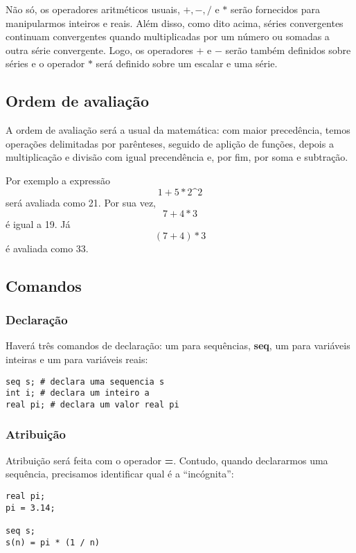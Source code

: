 \documentclass[a4 paper, 12pt]{article}
\begin{document}
N\~ao s\'o, os operadores aritm\'eticos usuais, $+, -, /$ e $*$
ser\~ao fornecidos para manipularmos inteiros e reais. Al\'em disso,
como dito acima, s\'eries convergentes continuam convergentes quando
multiplicadas por um n\'umero ou somadas a outra s\'erie
convergente. Logo, os operadores $+$ e $-$ ser\~ao tamb\'em definidos
sobre s\'eries e o operador $*$ ser\'a definido sobre um escalar e uma
s\'erie.

\subsection{Ordem de avalia\c c\~ao}
A ordem de avalia\c c\~ao ser\'a a usual da matem\'atica: com maior
preced\^encia, temos opera\c c\~oes delimitadas por par\^enteses,
seguido de apli\c c\~ao de fun\c c\~oes, depois a multiplica\c c\~ao e
divis\~ao com igual precend\^encia e, por fim, por soma e subtra\c
c\~ao.

Por exemplo a express\~ao
\begin{equation}
   1 + 5 * 2 \textrm{\textasciicircum} 2
\end{equation}
ser\'a avaliada como 21. Por sua vez,
\begin{equation}
  7 + 4 * 3
\end{equation}
\'e igual a 19. J\'a
\begin{equation}
  ( 7 + 4 ) * 3
\end{equation}
\'e avaliada como 33.

\subsection{Comandos}
\subsubsection{Declara\c c\~ao}
Haver\'a tr\^es comandos de declara\c c\~ao: um para sequ\^encias,
\textbf{seq}, um para vari\'aveis inteiras e um para vari\'aveis
reais:
\begin{verbatim}
seq s; # declara uma sequencia s
int i; # declara um inteiro a
real pi; # declara um valor real pi
\end{verbatim}
\subsubsection{Atribui\c c\~ao}
Atribui\c c\~ao ser\'a feita com o operador \textbf{=}. Contudo,
quando declararmos uma sequ\^encia, precisamos identificar qual \'e a
``inc\'ognita'':
\begin{verbatim}
real pi;
pi = 3.14;

seq s;
s(n) = pi * (1 / n)
\end{verbatim}
\end{document}
